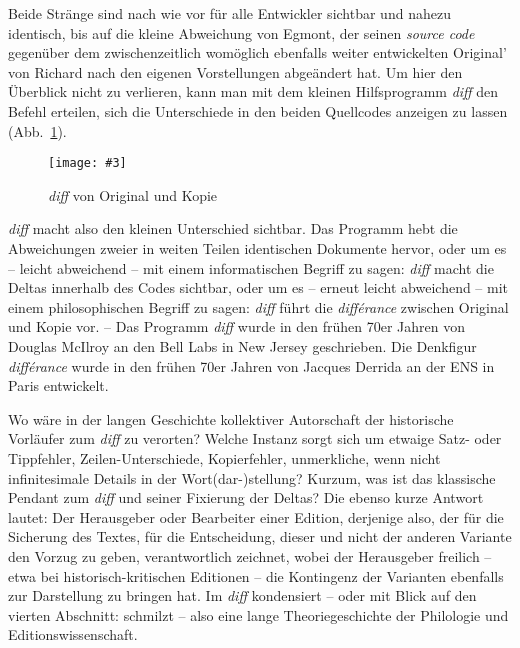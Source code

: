 \documentclass[a4paper,10pt]{article}
\newcommand{\pngbild}[4]{\texttt{[image: \#3]}}
\begin{document}
Beide Stränge sind nach wie vor für alle Entwickler sichtbar und nahezu identisch, bis auf die kleine Abweichung von {\color{hokkaido}Egmont}, der seinen \emph{source code} gegenüber dem zwischenzeitlich womöglich ebenfalls weiter entwickelten Original' von {\color{dzug}Richard} nach den eigenen Vorstellungen abgeändert hat. Um hier den Überblick nicht zu verlieren, kann man mit dem kleinen Hilfsprogramm \emph{diff} den Befehl erteilen, sich die Unterschiede in den beiden Quellcodes anzeigen zu lassen (Abb.~\ref{abb:orikopie}).


\begin{figure}[ht]
\begin{center}
\pngbild{433}{176}{../bilder/Abb-2.png}{1.1\textwidth}\\[-3mm]
\caption{\emph{diff} von Original und Kopie}\label{abb:orikopie}
\end{center}
\end{figure}

\enlargethispage{6mm}

\emph{diff} macht also den kleinen Unterschied sichtbar. Das Programm hebt die Abweichungen zweier in weiten Teilen identischen Dokumente hervor, oder um es – leicht abweichend – mit einem informatischen Begriff zu sagen: \emph{diff} macht die Deltas innerhalb des Codes sichtbar, oder um es – erneut leicht abweichend – mit einem philosophischen Begriff zu sagen: \emph{diff} führt die \emph{différance} zwischen Original und Kopie vor. – Das Programm \emph{diff} wurde in den frühen 70er Jahren von Douglas McIlroy an den Bell Labs in New Jersey geschrieben. Die Denkfigur \emph{différance} wurde in den frühen 70er Jahren von Jacques Derrida an der ENS in Paris entwickelt. 

Wo wäre in der langen Geschichte kollektiver Autorschaft der historische Vorläufer zum \emph{diff} zu verorten? Welche Instanz sorgt sich um etwaige Satz- oder Tippfehler, Zeilen-Unterschiede, Kopierfehler, unmerkliche, wenn nicht infinitesimale Details in der Wort(dar-)stellung? Kurzum, was ist das klassische Pendant zum \emph{diff} und seiner Fixierung der Deltas? Die ebenso kurze Antwort lautet: Der Herausgeber oder Bearbeiter einer Edition, derjenige also, der für die Sicherung des Textes, für die Entscheidung, dieser und nicht der anderen Variante den Vorzug zu geben, verantwortlich zeichnet, wobei der Herausgeber freilich – etwa bei historisch-kritischen Editionen – die Kontingenz der Varianten ebenfalls zur Darstellung zu bringen hat. Im \emph{diff} kondensiert – oder mit Blick auf den vierten Abschnitt: schmilzt – also eine lange Theoriegeschichte der Philologie und Editionswissenschaft.  
\end{document}
